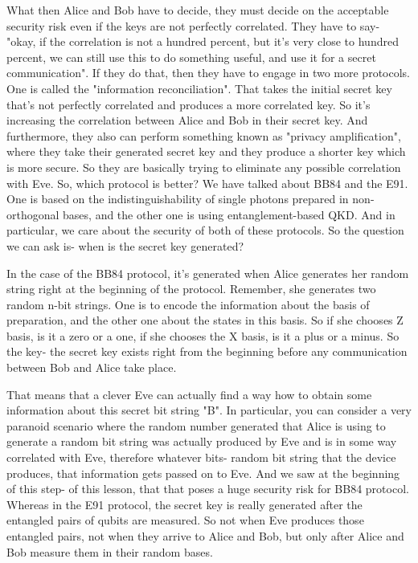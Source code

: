 What then Alice and Bob have to decide, they must decide on the acceptable security risk even if the keys are not perfectly correlated. They have to say- "okay, if the correlation is not a hundred percent, but it's very close to hundred percent, we can still use this to do something useful, and use it for a secret communication". If they do that, then they have to engage in two more protocols. One is called the "information reconciliation". That takes the initial secret key that's not perfectly correlated and produces a more correlated key. So it's increasing the correlation between Alice and Bob in their secret key. And furthermore, they also can perform something known as "privacy amplification", where they take their generated secret key and they produce a shorter key which is more secure. So they are basically trying to eliminate any possible correlation with Eve. So, which protocol is better? We have talked about BB84 and the E91. One is based on the indistinguishability of single photons prepared in non-orthogonal bases, and the other one is using entanglement-based QKD. And in particular, we care about the security of both of these protocols. So the question we can ask is- when is the secret key generated?

In the case of the BB84 protocol, it's generated when Alice generates her random string right at the beginning of the protocol. Remember, she generates two random n-bit strings. One is to encode the information about the basis of preparation, and the other one about the states in this basis. So if she chooses Z basis, is it a zero or a one, if she chooses the X basis, is it a plus or a minus. So the key- the secret key exists right from the beginning before any communication between Bob and Alice take place.

That means that a clever Eve can actually find a way how to obtain some information about this secret bit string "B". In particular, you can consider a very paranoid scenario where the random number generated that Alice is using to generate a random bit string was actually produced by Eve and is in some way correlated with Eve, therefore whatever bits- random bit string that the device produces, that information gets passed on to Eve. And we saw at the beginning of this step- of this lesson, that that poses a huge security risk for BB84 protocol. Whereas in the E91 protocol, the secret key is really generated after the entangled pairs of qubits are measured. So not when Eve produces those entangled pairs, not when they arrive to Alice and Bob, but only after Alice and Bob measure them in their random bases.

